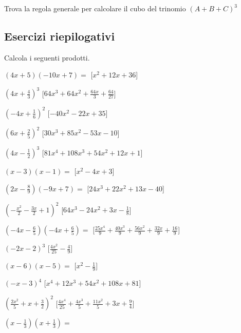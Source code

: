 \begin{esercizio}
 \label{ese:11.30}
 Trova la regola generale per calcolare il cubo del trinomio
\((A+B+C)^{3}\)
\end{esercizio}


\subsection{Esercizi riepilogativi}

\begin{esercizio}[\Ast]
\label{ese:10.21}
Calcola i seguenti prodotti.
 \begin{enumeratea}
\spazielenx
\item \(\left(4 x + 5\right)\left(- 10 x + 7\right)=\)
  \hfill [\(x^{2} + 12 x + 36\)]
\item \(\left(4 x + \frac{4}{3}\right)^{3}\)
  \hfill [\(64 x^{3} + 64 x^{2} + \frac{64 x}{3} + \frac{64}{27}\)]
\item \(\left(- 4 x + \frac{1}{6}\right)^{2}\)
  \hfill [\(- 40 x^{2} - 22 x + 35\)]
\item \(\left(6 x + \frac{2}{5}\right)^{2}\)
  \hfill [\(30 x^{3} + 85 x^{2} - 53 x - 10\)]
\item \(\left(4 x - \frac{1}{2}\right)^{3}\)
  \hfill [\(81 x^{4} + 108 x^{3} + 54 x^{2} + 12 x + 1\)]
\item \(\left(x - 3\right)\left(x - 1\right)=\)
  \hfill [\(x^{2} - 4 x + 3\)]
\item \(\left(2 x - \frac{8}{9}\right)\left(- 9 x + 7\right)=\)
  \hfill [\(24 x^{3} + 22 x^{2} + 13 x - 40\)]
\item \(\left(- \frac{x^{2}}{2} - \frac{3 x}{2} + 1\right)^{2}\)
  \hfill [\(64 x^{3} - 24 x^{2} + 3 x - \frac{1}{8}\)]
\item \(\left(- 4 x - \frac{6}{5}\right)\left(- 4 x + \frac{6}{5}\right)=\)
  \hfill [\(\frac{25 x^{4}}{9} + \frac{40 x^{3}}{9} + \frac{56 x^{2}}{9} + 
\frac{32 x}{9} + \frac{16}{9}\)]
\item \(\left(- 2 x - 2\right)^{3}\)
  \hfill [\(\frac{4 x^{2}}{25} - \frac{4}{9}\)]
\item \(\left(x - 6\right)\left(x - 5\right)=\)
  \hfill [\(x^{2} - \frac{1}{9}\)]
\item \(\left(- x - 3\right)^{4}\)
  \hfill [\(x^{4} + 12 x^{3} + 54 x^{2} + 108 x + 81\)]
\item \(\left(\frac{2 x^{2}}{5} + x + \frac{3}{2}\right)^{2}\)
  \hfill [\(\frac{4 x^{4}}{25} + \frac{4 x^{3}}{5} + \frac{11 x^{2}}{5} + 3 
x + \frac{9}{4}\)]
\item \(\left(x - \frac{1}{3}\right)\left(x + \frac{1}{3}\right)=\)

\end{enumeratea}
\end{esercizio}

